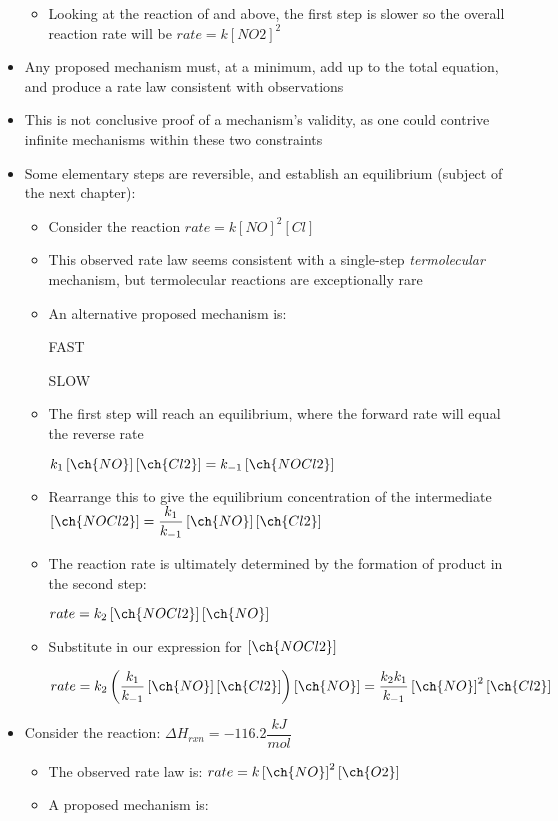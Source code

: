 \documentclass[12pt, openany, letterpaper]{memoir}
\begin{document}
\begin{itemize}
\begin{itemize}
		\item Looking at the reaction of  and  above, the first step is slower so the overall reaction rate will be $rate=k\left[NO2\right]^2$
	\end{itemize}
	\item Any proposed mechanism must, at a minimum, add up to the total equation, and produce a rate law consistent with observations
	\item This is not conclusive proof of a mechanism's validity, as one could contrive infinite mechanisms within these two constraints
	\item Some elementary steps are reversible, and establish an equilibrium (subject of the next chapter):
	\begin{itemize}
		\item Consider the reaction  \hspace{1em} $rate=k\left[NO\right]^2\left[Cl\right]$
		\item This observed rate law seems consistent with a single-step \emph{termolecular} mechanism, but termolecular reactions are exceptionally rare
		\item An alternative proposed mechanism is:
		
		 \hspace{1em} FAST
		
		 \hspace{1em} SLOW
		\item The first step will reach an equilibrium, where the forward rate will equal the reverse rate
		
		$k_1\left[\ch{NO}\right]\left[\ch{Cl2}\right] = k_{-1}\left[\ch{NOCl2}\right]$
		\item Rearrange this to give the equilibrium concentration of the intermediate $\left[\ch{NOCl2}\right]=\dfrac{k_1}{k_{-1}}\left[\ch{NO}\right]\left[\ch{Cl2}\right]$
		\item The reaction rate is ultimately determined by the formation of product in the second step:
		
		$rate=k_2\left[\ch{NOCl2}\right]\left[\ch{NO}\right]$
		\item Substitute in our expression for $\left[\ch{NOCl2}\right]$
		
		$rate=k_2\left(\dfrac{k_1}{k_{-1}}\left[\ch{NO}\right]\left[\ch{Cl2}\right]\right)\left[\ch{NO}\right]=\dfrac{k_2k_1}{k_{-1}}\left[\ch{NO}\right]^2\left[\ch{Cl2}\right]$		
	\end{itemize}
	\item Consider the reaction:  \hspace{1em} $\Delta H_{rxn}=-116.2\dfrac{kJ}{mol}$ 
	\begin{itemize}
		\item The observed rate law is: $rate=k\left[\ch{NO}\right]^2\left[\ch{O2}\right]$
		\item A proposed mechanism is:
		

\end{itemize}
\end{itemize}
\end{document}
